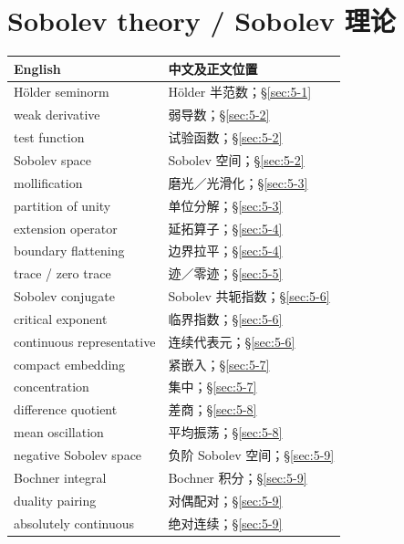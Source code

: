\section*{Sobolev theory / Sobolev 理论}
\begin{center}\small
\begin{tabular}{@{}p{.53\linewidth}p{.38\linewidth}@{}}
\textbf{English}&\textbf{中文及正文位置}\\\hline
H\"older seminorm & H\"older 半范数；\S\ref{sec:5-1}\\
weak derivative & 弱导数；\S\ref{sec:5-2}\\
test function & 试验函数；\S\ref{sec:5-2}\\
Sobolev space & Sobolev 空间；\S\ref{sec:5-2}\\
mollification & 磨光／光滑化；\S\ref{sec:5-3}\\
partition of unity & 单位分解；\S\ref{sec:5-3}\\
extension operator & 延拓算子；\S\ref{sec:5-4}\\
boundary flattening & 边界拉平；\S\ref{sec:5-4}\\
trace / zero trace & 迹／零迹；\S\ref{sec:5-5}\\
Sobolev conjugate & Sobolev 共轭指数；\S\ref{sec:5-6}\\
critical exponent & 临界指数；\S\ref{sec:5-6}\\
continuous representative & 连续代表元；\S\ref{sec:5-6}\\
compact embedding & 紧嵌入；\S\ref{sec:5-7}\\
concentration & 集中；\S\ref{sec:5-7}\\
difference quotient & 差商；\S\ref{sec:5-8}\\
mean oscillation & 平均振荡；\S\ref{sec:5-8}\\
negative Sobolev space & 负阶 Sobolev 空间；\S\ref{sec:5-9}\\
Bochner integral & Bochner 积分；\S\ref{sec:5-9}\\
duality pairing & 对偶配对；\S\ref{sec:5-9}\\
absolutely continuous & 绝对连续；\S\ref{sec:5-9}
\end{tabular}
\end{center}

\clearpage
